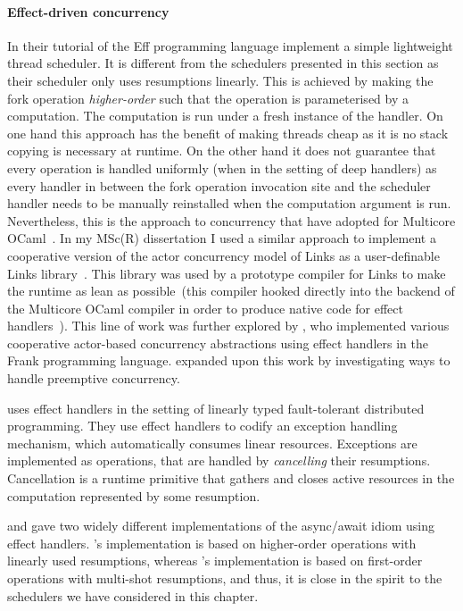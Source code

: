 \documentclass[12pt,phd,lfcs,twoside,openright,logo,leftchapter,normalheadings]{infthesis}
\theoremstyle{plain}
\theoremstyle{definition}
\begin{document}
\paragraph{Effect-driven concurrency}
In their tutorial of the Eff programming language \citet{BauerP15}
implement a simple lightweight thread scheduler. It is different from
the schedulers presented in this section as their scheduler only uses
resumptions linearly. This is achieved by making the fork operation
\emph{higher-order} such that the operation is parameterised by a
computation. The computation is run under a fresh instance of the
handler. On one hand this approach has the benefit of making threads
cheap as it is no stack copying is necessary at runtime. On the other
hand it does not guarantee that every operation is handled uniformly
(when in the setting of deep handlers) as every handler in between the
fork operation invocation site and the scheduler handler needs to be
manually reinstalled when the computation argument is
run. Nevertheless, this is the approach to concurrency that
\citet{DolanWSYM15} have adopted for Multicore
OCaml~\cite{DolanWSYM15}.
%
In my MSc(R) dissertation I used a similar approach to implement a
cooperative version of the actor concurrency model of Links as a
user-definable Links library~\cite{Hillerstrom16}. This library was
used by a prototype compiler for Links to make the runtime as lean as
possible~(this compiler hooked directly into the backend of the
Multicore OCaml compiler in order to produce native code for effect
handlers~\cite{HillerstromL16}).
%
This line of work was further explored by \citet{Convent17}, who
implemented various cooperative actor-based concurrency abstractions
using effect handlers in the Frank programming
language. \citet{Poulson20} expanded upon this work by investigating
ways to handle preemptive concurrency.

\citet{FowlerLMD19} uses effect handlers in the setting of linearly
typed fault-tolerant distributed programming. They use effect handlers
to codify an exception handling mechanism, which automatically
consumes linear resources. Exceptions are implemented as operations,
that are handled by \emph{cancelling} their resumptions. Cancellation
is a runtime primitive that gathers and closes active resources in the
computation represented by some resumption.

\citet{DolanEHMSW17} and \citet{Leijen17a} gave two widely different
implementations of the async/await idiom using effect
handlers. \citeauthor{DolanEHMSW17}'s implementation is based on
higher-order operations with linearly used resumptions, whereas
\citeauthor{Leijen17a}'s implementation is based on first-order
operations with multi-shot resumptions, and thus, it is close in the
spirit to the schedulers we have considered in this chapter.
\end{document}
